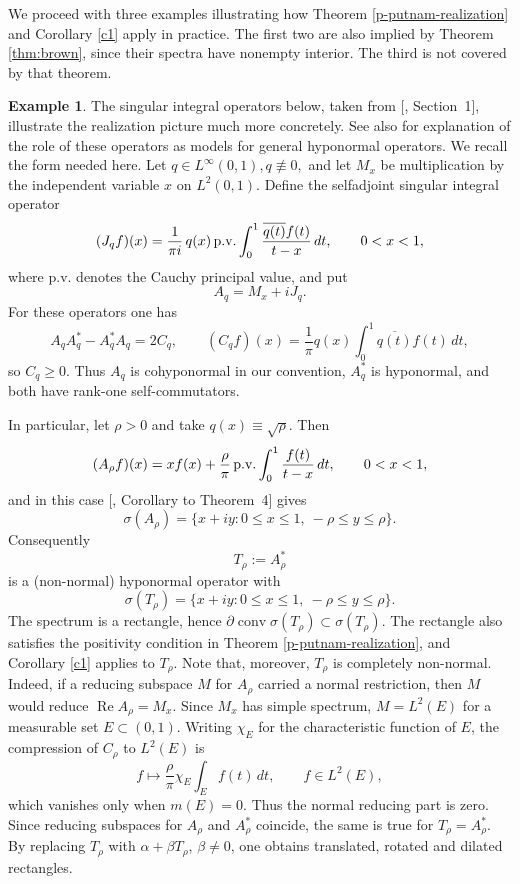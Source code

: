 \documentclass[11pt]{amsart}
\makeatletter
\numberwithin{equation}{section}
\theoremstyle{definition}
\newtheorem{example}[theorem]{Example}
\theoremstyle{remark}
\newcommand{\loccite}[2]{[\@ifundefined{b@#2}{\textbf{??}}{\csname b@#2\endcsname}, #1]}
\DeclareMathOperator{\conv}{conv}
\makeatother
\begin{document}
We proceed with three examples illustrating how Theorem \ref{p-putnam-realization} and Corollary \ref{c1} apply in practice. The first two are also implied by Theorem \ref{thm:brown}, since their spectra have nonempty interior. The third is not covered by that theorem.
\begin{example}
The singular integral operators below, taken from \loccite{Section~1}{P70}, illustrate the realization picture much more concretely. See also \cite[Chapter II.2, Example 3]{MP}
for explanation of the role of these operators as models for general hyponormal operators.
We recall the form needed here. Let $q\in L^\infty(0,1), q \not \equiv 0,$ and let $M_x$ be multiplication by the independent variable $x$ on $L^2(0,1)$. Define the selfadjoint singular integral operator
$$
    (J_q f)(x)=\frac{1}{\pi i}\,q(x)\,\text{\rm p.v.}
    \int_0^1\frac{\overline{q(t)}f(t)}{t-x}\,dt,
    \qquad 0<x<1,
$$
where p.v. denotes the Cauchy principal value, and put
$$
    A_q=M_x+iJ_q.
$$
For these operators one has
$$
    A_q A_q^*-A_q^*A_q=2C_q,
    \qquad
    (C_q f)(x)=\frac{1}{\pi}q(x)
    \int_0^1\overline{q(t)}f(t)\,dt,
$$
so $C_q\ge0$. Thus $A_q$ is cohyponormal in our convention, $A_q^*$ is hyponormal,
and both have rank-one self-commutators.

In particular, let $\rho>0$ and take $q(x)\equiv\sqrt\rho$. Then
$$
    (A_\rho f)(x)=xf(x)+\frac{\rho}{\pi}\,\text{\rm p.v.}
    \int_0^1\frac{f(t)}{t-x}\,dt,
    \qquad 0<x<1,
$$
and in this case \loccite{Corollary to Theorem~4}{P70} gives
$$
    \sigma(A_\rho)=
    \{x+iy:0\le x\le1,\ -\rho\le y\le\rho\}.
$$
Consequently
$$
    T_\rho:=A_\rho^*
$$
is a (non-normal) hyponormal operator with
$$
    \sigma(T_\rho)=
    \{x+iy:0\le x\le1,\ -\rho\le y\le\rho\}.
$$
The spectrum is a rectangle, hence \(\partial\conv\sigma(T_\rho)\subset\sigma(T_\rho)\). The rectangle also satisfies the positivity condition in Theorem \ref{p-putnam-realization}, and Corollary \ref{c1} applies to $T_\rho$. Note that, moreover, $T_\rho$ 
is completely non-normal. 
Indeed, if a reducing subspace $M$ for $A_\rho$ carried a normal restriction, then $M$ would reduce $\operatorname{Re} A_\rho=M_x$. Since $M_x$ has simple spectrum, $M=L^2(E)$ for a measurable set $E\subset(0,1)$. Writing $\chi_E$ for the characteristic function of $E$, the compression of $C_\rho$ to $L^2(E)$ is
$$
    f\mapsto \frac{\rho}{\pi}\chi_E\int_E f(t)\,dt, \qquad f \in L^2(E),
$$
which vanishes only when $m(E)=0$. Thus the normal reducing part is zero. 
Since reducing subspaces for \(A_\rho\) and \(A_\rho^*\) coincide, the same
is true for \(T_\rho=A_\rho^*\).
By replacing $T_\rho$ with $\alpha+\beta T_\rho$, $\beta\neq0$, one obtains translated, rotated and dilated rectangles.
\end{example}
\end{document}
